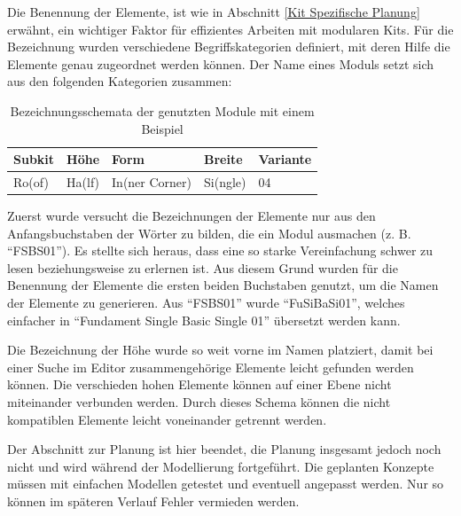 \vspace{-10.5pt}
Die Benennung der Elemente, ist wie in Abschnitt \ref{Kit Spezifische Planung} erwähnt, ein wichtiger Faktor für effizientes Arbeiten mit modularen Kits. Für die Bezeichnung wurden verschiedene Begriffskategorien definiert, mit deren Hilfe die Elemente genau zugeordnet werden können. Der Name eines Moduls setzt sich aus den folgenden Kategorien zusammen:
\begin{table}[H]
\fontsize{9}{11}\selectfont
\centering
\begin{tabular}{ l  l  l  l  l }
Subkit & Höhe & Form & Breite & Variante\\ \hline
Ro(of) & Ha(lf) & In(ner Corner) & Si(ngle) & 04
\end{tabular}
 \caption{Bezeichnungsschemata der genutzten Module mit einem Beispiel}
\end{table}
\vspace{-10.5pt}
Zuerst wurde versucht die Bezeichnungen der Elemente nur aus den Anfangsbuchstaben der Wörter zu bilden, die ein Modul ausmachen (z. B. \enquote{FSBS01}). Es stellte sich heraus, dass eine so starke Vereinfachung schwer zu lesen beziehungsweise zu erlernen ist. Aus diesem Grund wurden für die Benennung der Elemente die ersten beiden Buchstaben genutzt, um die Namen der Elemente zu generieren. Aus \enquote{FSBS01} wurde \enquote{FuSiBaSi01}, welches einfacher in \enquote{Fundament Single Basic Single 01} übersetzt werden kann.
\par
Die Bezeichnung der Höhe wurde so weit vorne im Namen platziert, damit bei einer Suche im Editor zusammengehörige Elemente leicht gefunden werden können. Die verschieden hohen Elemente können auf einer Ebene nicht miteinander verbunden werden. Durch dieses Schema können die nicht kompatiblen Elemente leicht voneinander getrennt werden.
\par
Der Abschnitt zur Planung ist hier beendet, die Planung insgesamt jedoch noch nicht und wird während der Modellierung fortgeführt. Die geplanten Konzepte müssen mit einfachen Modellen getestet und eventuell angepasst werden. Nur so können im späteren Verlauf Fehler vermieden werden.
\enlargethispage{10.5pt}
